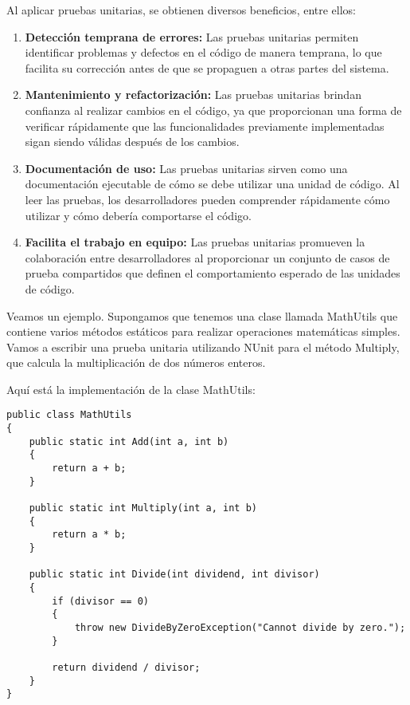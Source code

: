 \documentclass[executivepaper]{article}
\begin{document}
Al aplicar pruebas unitarias, se obtienen diversos beneficios, entre ellos:
\begin{enumerate}
    \item \textbf{Detección temprana de errores:} Las pruebas unitarias permiten identificar problemas y defectos en el código de manera temprana, lo que facilita su corrección antes de que se propaguen a otras partes del sistema.
    \item \textbf{Mantenimiento y refactorización:} Las pruebas unitarias brindan confianza al realizar cambios en el código, ya que proporcionan una forma de verificar rápidamente que las funcionalidades previamente implementadas sigan siendo válidas después de los cambios.
    \item \textbf{Documentación de uso:} Las pruebas unitarias sirven como una documentación ejecutable de cómo se debe utilizar una unidad de código. Al leer las pruebas, los desarrolladores pueden comprender rápidamente cómo utilizar y cómo debería comportarse el código.
    \item \textbf{Facilita el trabajo en equipo:} Las pruebas unitarias promueven la colaboración entre desarrolladores al proporcionar un conjunto de casos de prueba compartidos que definen el comportamiento esperado de las unidades de código.
\end{enumerate}

Veamos un ejemplo. Supongamos que tenemos una clase llamada MathUtils que contiene varios métodos estáticos para realizar operaciones matemáticas simples. Vamos a escribir una prueba unitaria utilizando NUnit para el método Multiply, que calcula la multiplicación de dos números enteros.

Aquí está la implementación de la clase MathUtils:
\begin{lstlisting}
public class MathUtils
{
    public static int Add(int a, int b)
    {
        return a + b;
    }

    public static int Multiply(int a, int b)
    {
        return a * b;
    }

    public static int Divide(int dividend, int divisor)
    {
        if (divisor == 0)
        {
            throw new DivideByZeroException("Cannot divide by zero.");
        }

        return dividend / divisor;
    }
}
\end{lstlisting}
\end{document}

